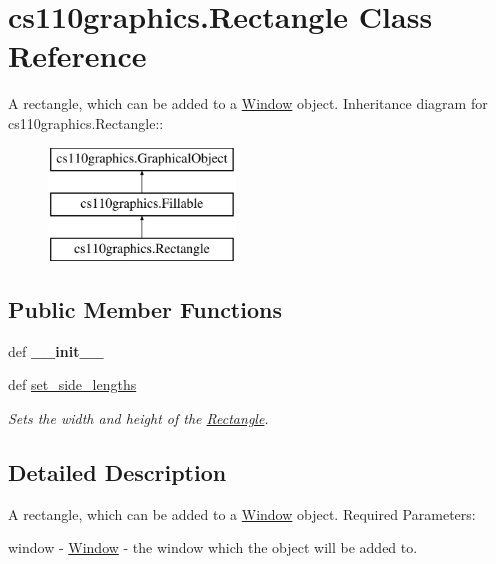 \hypertarget{classcs110graphics_1_1Rectangle}{
\section{cs110graphics.Rectangle Class Reference}
\label{classcs110graphics_1_1Rectangle}
}


A rectangle, which can be added to a \hyperlink{classcs110graphics_1_1Window}{Window} object.  
Inheritance diagram for cs110graphics.Rectangle::\begin{figure}[H]
\begin{center}
\leavevmode
\includegraphics[height=3cm]{classcs110graphics_1_1Rectangle}
\end{center}
\end{figure}
\subsection*{Public Member Functions}
\begin{DoxyCompactItemize}
\item 
\hypertarget{classcs110graphics_1_1Rectangle_a57049aac9a7f4aa8823112290888a6a8}{
def {\bfseries \_\-\_\-init\_\-\_\-}}
\label{classcs110graphics_1_1Rectangle_a57049aac9a7f4aa8823112290888a6a8}

\item 
def \hyperlink{classcs110graphics_1_1Rectangle_a080e6851b24278d7533e0fa9920ea036}{set\_\-side\_\-lengths}
\begin{DoxyCompactList}\small\item\em Sets the width and height of the \hyperlink{classcs110graphics_1_1Rectangle}{Rectangle}. \item\end{DoxyCompactList}\end{DoxyCompactItemize}


\subsection{Detailed Description}
A rectangle, which can be added to a \hyperlink{classcs110graphics_1_1Window}{Window} object. Required Parameters:
\begin{DoxyItemize}
\item window -\/ \hyperlink{classcs110graphics_1_1Window}{Window} -\/ the window which the object will be added to.
\end{DoxyItemize}

